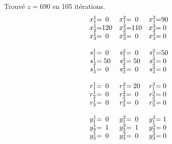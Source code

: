 Trouvé $z = 690$ en 105 itérations.
$$\begin{array}{c @{ = } c c @{ = } c c @{ = } c }
x_1^1&0&x_1^2&0&x_1^3&90 \\
x_2^1&120&x_2^2&110&x_2^3&0 \\
x_3^1&0&x_3^2&0&x_3^3&0 \\
\multicolumn{3}{c}{}\\s_1^1&0&s_1^2&0&s_1^3&50 \\
s_2^1&50&s_2^2&50&s_2^3&0 \\
s_3^1&0&s_3^2&0&s_3^3&0 \\
\multicolumn{3}{c}{}\\r_1^1&0&r_1^2&20&r_1^3&0 \\
r_2^1&0&r_2^2&0&r_2^3&0 \\
r_3^1&0&r_3^2&0&r_3^3&0 \\
\multicolumn{3}{c}{}\\y_1^1&0&y_1^2&0&y_1^3&1 \\
y_2^1&1&y_2^2&1&y_2^3&0 \\
y_3^1&0&y_3^2&0&y_3^3&0 \\
\end{array}$$
